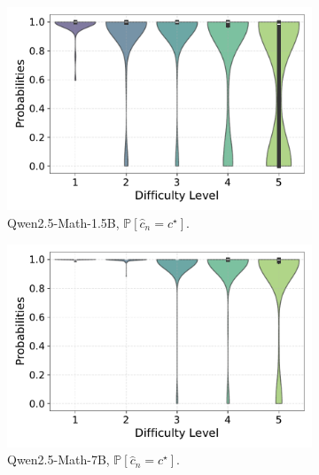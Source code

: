 \begin{figure}[h!]
  \centering
  \begin{subfigure}{0.49\textwidth}
      \centering
      \includegraphics[width=\textwidth]{figs/QWEN-MATH-1.5B_violin_maj100_probability_adaptive_01_NO_ground_truth.pdf}
      \caption{Qwen2.5-Math-1.5B, $\mathbb{P}[\widehat{c}_n = c^\star]$.}
      \label{fig:QWEN-MATH-1.5B-probs-0.1}
  \end{subfigure}
  \hfill
  \begin{subfigure}{0.49\textwidth}
      \centering
      \includegraphics[width=\textwidth]{figs/QWEN-MATH-7B_violin_maj100_probability_adaptive_01_NO_ground_truth.pdf}
        \caption{Qwen2.5-Math-7B, $\mathbb{P}[\widehat{c}_n = c^\star]$.}
      \label{fig:QWEN-MATH-7B-probs-0.1}
  \end{subfigure}
  \vfill
  \begin{subfigure}{0.49\textwidth}

\end{subfigure}
\end{figure}
